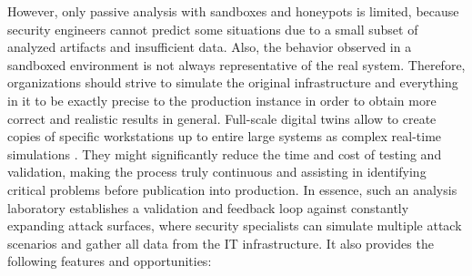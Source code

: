 However, only passive analysis with sandboxes and honeypots is limited, because security engineers cannot predict some situations due to a small subset of analyzed artifacts and insufficient data. Also, the behavior observed in a sandboxed environment is not always representative of the real system. Therefore, organizations should strive to simulate the original infrastructure and everything in it to be exactly precise to the production instance in order to obtain more correct and realistic results in general. Full-scale digital twins allow to create copies of specific workstations up to entire large systems as complex real-time simulations \cite{alhamam2025comprehensive}. They might significantly reduce the time and cost of testing and validation, making the process truly continuous and assisting in identifying critical problems before publication into production. In essence, such an analysis laboratory establishes a validation and feedback loop against constantly expanding attack surfaces, where security specialists can simulate multiple attack scenarios and gather all data from the IT infrastructure. It also provides the following features and opportunities:

